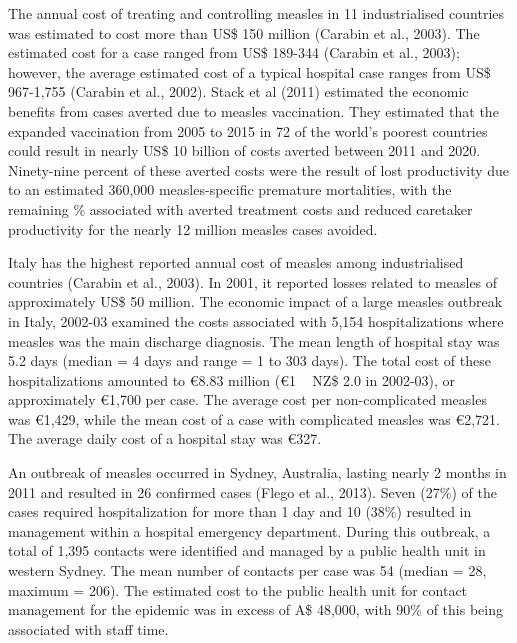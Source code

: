 \documentclass{article}
\begin{document}
The annual cost of treating and controlling measles in 11 industrialised countries was estimated to cost more than US\$ 150 million (Carabin et al., 2003). The estimated cost for a case ranged from US\$ 189-344 (Carabin et al., 2003); however, the average estimated cost of a typical hospital case ranges from US\$ 967-1,755 (Carabin et al., 2002). Stack et al (2011) estimated the economic benefits from cases averted due to measles vaccination. They estimated that the expanded vaccination from 2005 to 2015 in 72 of the world's poorest countries could result in nearly US\$ 10 billion of costs averted between 2011 and 2020. Ninety-nine percent of these averted costs were the result of lost productivity due to an estimated 360,000 measles-specific premature mortalities, with the remaining \% associated with averted treatment costs and reduced caretaker productivity for the nearly 12 million measles cases avoided.

Italy has the highest reported annual cost of measles among industrialised countries (Carabin et al., 2003). In 2001, it reported losses related to measles of approximately US\$ 50 million. The economic impact of a large measles outbreak in Italy, 2002-03 examined the costs associated with 5,154 hospitalizations where measles was the main discharge diagnosis. The mean length of hospital stay was 5.2 days (median = 4 days and range = 1 to 303 days). The total cost of these hospitalizations amounted to \euro 8.83 million (\euro 1 ~ NZ\$ 2.0 in 2002-03), or approximately \euro 1,700 per case. The average cost per non-complicated measles was  \euro 1,429, while the mean cost of a case with complicated measles was  \euro 2,721. The average daily cost of a hospital stay was  \euro 327.

An outbreak of measles occurred in Sydney, Australia, lasting nearly 2 months in 2011 and resulted in 26 confirmed cases (Flego et al., 2013). Seven (27\%) of the cases required hospitalization for more than 1 day and 10 (38\%) resulted in management within a hospital emergency department. During this outbreak, a total of 1,395 contacts were identified and managed by a public health unit in western Sydney. The mean number of contacts per case was 54 (median = 28, maximum = 206). The estimated cost to the public health unit for contact management for the epidemic was in excess of A\$ 48,000, with 90\% of this being associated with staff time. 
\end{document}
